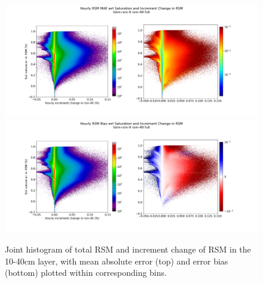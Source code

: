 \begin{figure}[hp!]
    \centering

    \includegraphics[width=.96\linewidth,draft=false]{figures/grid-eval_lstm-rsm-9_full/eval-grid_full_lstm-rsm-9_rsm-40_hist-state-increment_abs-err.png}
    \includegraphics[width=.96\linewidth,draft=false]{figures/grid-eval_lstm-rsm-9_full/eval-grid_full_lstm-rsm-9_rsm-40_hist-state-increment_bias.png}

    \caption{Joint histogram of total RSM and increment change of RSM in the 10-40cm layer, with mean absolute error (top) and error bias (bottom) plotted within corresponding bins.}
    \label{lstm-rsm-9-sihist-rsm-40}
\end{figure}

